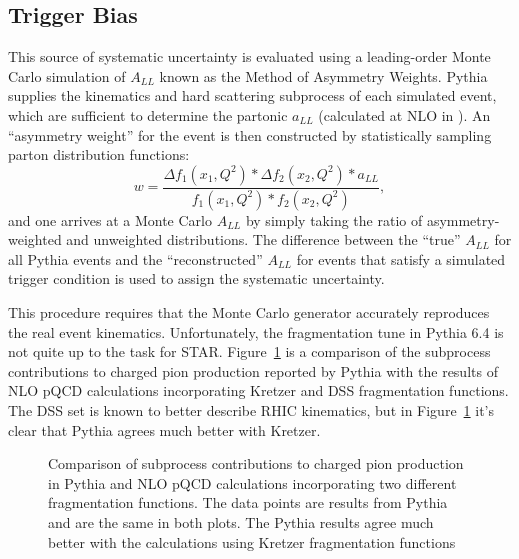 \subsection{Trigger Bias}


This source of systematic uncertainty is evaluated using a leading-order Monte
Carlo simulation of \(A_{LL}\) known as the Method of Asymmetry Weights. Pythia
supplies the kinematics and hard scattering subprocess of each simulated event,
which are sufficient to determine the partonic \(a_{LL}\) (calculated at NLO in
\cite{}). An ``asymmetry weight'' for the event is then constructed by
statistically sampling parton distribution functions:
%
\begin{equation}
  w = \frac{\Delta f_1(x_1, Q^2) * \Delta f_2(x_2, Q^2) * a_{LL}}{f_1(x_1, Q^2) * f_2(x_2, Q^2)},
\end{equation}
%
and one arrives at a Monte Carlo \(A_{LL}\) by simply taking the ratio of
asymmetry-weighted and unweighted distributions. The difference between the
``true'' \(A_{LL}\) for all Pythia events and the ``reconstructed'' \(A_{LL}\)
for events that satisfy a simulated trigger condition is used to assign the
systematic uncertainty.

This procedure requires that the Monte Carlo generator accurately reproduces the real event kinematics. Unfortunately, the fragmentation tune in Pythia 6.4 is not quite up to the task for STAR. Figure~\ref{fig:subprocess-fractions} is a comparison of the subprocess contributions to charged pion production reported by Pythia with the results of NLO pQCD calculations incorporating Kretzer and DSS fragmentation functions. The DSS set is known to better describe RHIC kinematics, but in Figure~\ref{fig:subprocess-fractions} it's clear that Pythia agrees much better with Kretzer.

\begin{figure}
  \caption{Comparison of subprocess contributions to charged pion production
  in Pythia and NLO pQCD calculations incorporating two different
  fragmentation functions.  The data points are results from Pythia and are the same in both plots. The Pythia results agree much better with the
  calculations using Kretzer fragmentation functions}
  \label{fig:subprocess-fractions}
\end{figure}

